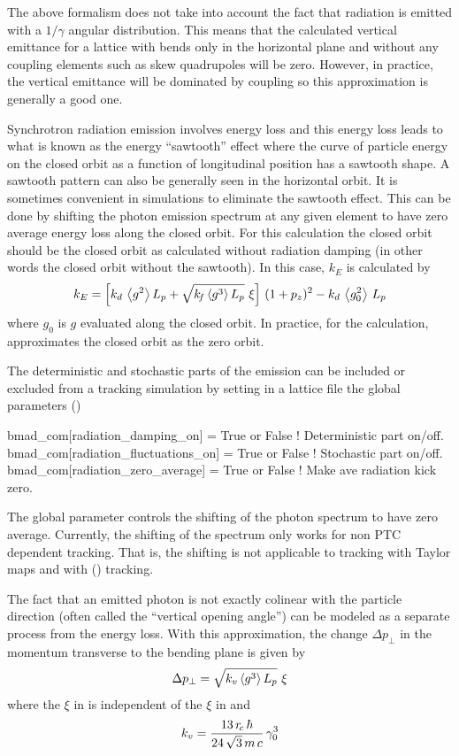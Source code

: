 The above formalism does not take into account the fact that radiation is emitted with a $1/\gamma$
angular distribution. This means that the calculated vertical emittance for a lattice with bends
only in the horizontal plane and without any coupling elements such as skew quadrupoles will be
zero. However, in practice, the vertical emittance will be dominated by coupling so this
approximation is generally a good one.

Synchrotron radiation emission involves energy loss and this energy loss leads to what is known as
the energy ``sawtooth'' effect where the curve of particle energy on the closed orbit as a function
of longitudinal position has a sawtooth shape. A sawtooth pattern can also be generally seen in the
horizontal orbit. It is sometimes convenient in simulations to eliminate the sawtooth effect. This
can be done by shifting the photon emission spectrum at any given element to have zero average
energy loss along the closed orbit. For this calculation the closed orbit should be the closed orbit
as calculated without radiation damping (in other words the closed orbit without the sawtooth). In
this case, $k_E$ is calculated by
\begin{equation}
  k_E = \left[ k_d \, \left\langle g^2 \right\rangle L_p + \sqrt{k_{\mkern-3 mu{f}} \left\langle g^3 \right\rangle L_p} \,\, \xi \right] \, (1 + p_z)^2 - 
  k_d \, \left\langle g_0^2 \right\rangle \, L_p
\end{equation}
where $g_0$ is $g$ evaluated along the closed orbit. In practice, for the calculation, \bmad
approximates the closed orbit as the zero orbit. 

The deterministic and stochastic parts of the emission can be included or excluded from a tracking
simulation by setting in a lattice file the \bmad global parameters ()
\begin{example}
  bmad_com[radiation_damping_on]      = True or False  ! Deterministic part on/off.
  bmad_com[radiation_fluctuations_on] = True or False  ! Stochastic part on/off.
  bmad_com[radiation_zero_average]    = True or False  ! Make ave radiation kick zero.
\end{example}
The global parameter  controls the shifting of the photon
spectrum to have zero average. Currently, the shifting of the spectrum only works for non PTC
dependent tracking. That is, the shifting is not applicable to tracking with Taylor maps and with
 () tracking.

The fact that an emitted photon is not exactly colinear with the particle direction (often called
the ``vertical opening angle'') can be modeled as a separate process from the energy loss. With this
approximation, the change $\Delta p_\perp$ in the momentum transverse to the bending plane is given
by
\begin{equation}
  \Delta p_\perp = \sqrt{k_v \left\langle g^3 \right\rangle L_p} \,\, \xi
  \label{dpkgl}
\end{equation}
where the $\xi$ in  is independent of the $\xi$ in  and
\begin{equation}
 k_v = \frac{13 \, r_{\!c} \, \hbar}{24 \, \sqrt{3} \, m \, c} \, \gamma_0^3
\end{equation}


